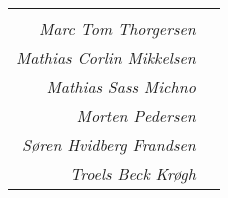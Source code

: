 \begin{tabular}[t]{rl}
	\begin{minipage}{0.5\textwidth}

		\centering
		\Large
		\begin{minipage}{0.75\textwidth}
			\centering
			\rule{\textwidth}{0.5pt}\\
			\textit{Marc Tom Thorgersen}
		\end{minipage}

		\vspace{70pt}
		\Large
		\begin{minipage}{0.75\textwidth}
			\centering
			\rule{\textwidth}{0.5pt}\\
			\textit{Mathias Corlin Mikkelsen}
		\end{minipage}

		\vspace{70pt}
		\Large
		\begin{minipage}{0.75\textwidth}
			\centering
			\rule{\textwidth}{0.5pt}\\
			\textit{Mathias Sass Michno}
		\end{minipage}

	\end{minipage}

	\begin{minipage}{0.5\textwidth}

		\centering
		\Large
		\begin{minipage}{0.75\textwidth}
			\centering
			\rule{\textwidth}{0.5pt}\\
			\textit{Morten Pedersen}
		\end{minipage}

		\vspace{70pt}
		\Large
		\begin{minipage}{0.75\textwidth}
			\centering
			\rule{\textwidth}{0.5pt}\\
			\textit{Søren Hvidberg Frandsen}
		\end{minipage}

		\vspace{70pt}
		\Large
		\begin{minipage}{0.75\textwidth}
			\centering
			\rule{\textwidth}{0.5pt}\\
			\textit{Troels Beck Krøgh}
		\end{minipage}

	\end{minipage}
\end{tabular}
